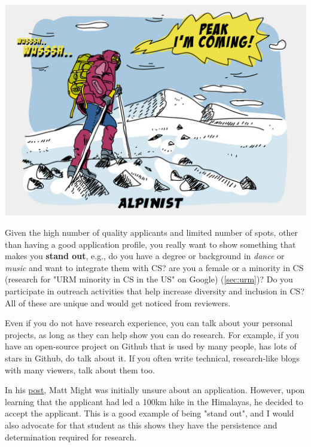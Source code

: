 \documentclass[oneside,11pt]{book}
\begin{document}
\begin{center}
  \includegraphics[scale=0.2]{files/alpinist-climbing-peak-mountain-comic-hand-drawn-vector-illustration.jpg}
\end{center}


Given the high number of quality applicants and limited number of spots, other than having a good application profile, you really want to show something that makes you \textbf{stand out}, e.g., do you have a degree or background in \emph{dance} or \emph{music} and want to integrate them with CS? are you a female or a minority in CS (research for "URM minority in CS in the US" on Google) (\autoref{sec:urm})? Do you participate in outreach activities that help increase diversity and inclusion in CS? All of these are unique and would get noticed from reviewers.

Even if you do not have research experience, you can talk about your personal projects, as long as they can help show you can do research. For example, if you have an open-source project on Github that is used by many people, has lots of stars in Github, do talk about it. If you often write technical, research-like blogs with many viewers, talk about them too.


In his \href{https://matt.might.net/articles/how-to-apply-and-get-in-to-graduate-school-in-science-mathematics-engineering-or-computer-science/}{post}, Matt Might was initially unsure about an application. However, upon learning that the applicant had led a 100km hike in the Himalayas, he decided to accept the applicant.  This is a good example of being "stand out", and I would also advocate for that student as this shows they have the persistence and determination required for research.
\end{document}
